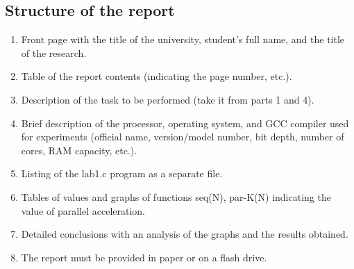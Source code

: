 { %
	\subsection{Structure of the report}
	\begin{enumerate}
		\item Front page with the title of the university, student's full name, and the title of the research.
		\item Table of the report contents (indicating the page number, etc.).
		\item Description of the task to be performed (take it from parts 1 and 4).
		\item Brief description of the processor, operating system, and GCC compiler used for experiments (official name, version/model number, bit depth, number of cores, RAM capacity, etc.).
		\item Listing of the lab1.c program as a separate file.
		\item Tables of values and graphs of functions seq(N), par-K(N) indicating the value of parallel acceleration.
		\item Detailed conclusions with an analysis of the graphs and the results obtained.
		\item The report must be provided in paper or on a flash drive.
	\end{enumerate}
}